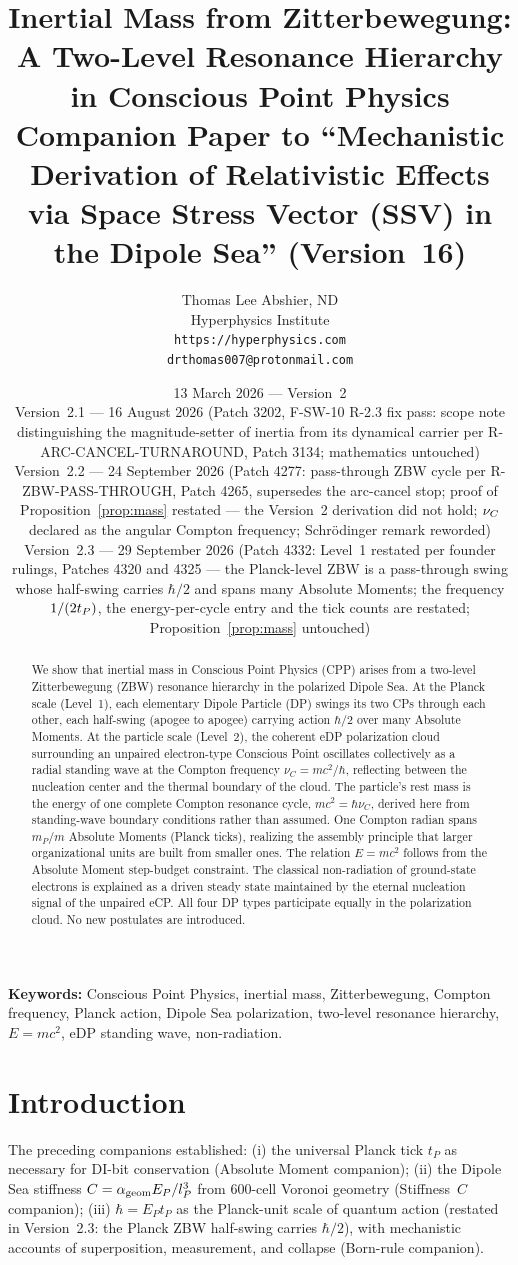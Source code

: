 \documentclass[12pt]{article}
\title{\textbf{Inertial Mass from Zitterbewegung:\\
A Two-Level Resonance Hierarchy in Conscious Point Physics}\\[6pt]
{\large Companion Paper to ``Mechanistic Derivation of Relativistic Effects\\
via Space Stress Vector (SSV) in the Dipole Sea'' (Version~16)}}
\author{Thomas Lee Abshier, ND\\
Hyperphysics Institute\\
\texttt{https://hyperphysics.com}\\
\texttt{drthomas007@protonmail.com}}
\date{13 March 2026 --- Version~2\\[2pt]
{\small Version~2.1 --- 16 August 2026 (Patch 3202, F-SW-10 R-2.3 fix pass:
scope note distinguishing the magnitude-setter of inertia from its dynamical
carrier per R-ARC-CANCEL-TURNAROUND, Patch 3134; mathematics untouched)\\[2pt]
Version~2.2 --- 24 September 2026 (Patch 4277: pass-through ZBW cycle per
R-ZBW-PASS-THROUGH, Patch 4265, supersedes the arc-cancel stop; proof of
Proposition~\ref{prop:mass} restated --- the Version~2 derivation did not hold;
$\nuC$ declared as the angular Compton frequency; Schr\"odinger remark
reworded)\\[2pt]
Version~2.3 --- 29 September 2026 (Patch 4332: Level~1 restated per founder rulings,
Patches 4320 and 4325 --- the Planck-level ZBW is a pass-through swing whose half-swing
carries $\hbar/2$ and spans many Absolute Moments; the frequency $1/(2\tP)$, the
energy-per-cycle entry and the tick counts are restated; Proposition~\ref{prop:mass}
untouched)}}
\newcommand{\lP}{l_P}
\newcommand{\EP}{E_P}
\newcommand{\tP}{t_P}
\newcommand{\mP}{m_P}
\newcommand{\nuC}{\nu_C}
\newcommand{\alphageom}{\alpha_{\rm geom}}
\begin{document}
\maketitle

\noindent\textbf{Keywords:} Conscious Point Physics, inertial mass,
Zitterbewegung, Compton frequency, Planck action, Dipole Sea polarization,
two-level resonance hierarchy, $E = mc^2$, eDP standing wave, non-radiation.

\begin{abstract}
We show that inertial mass in Conscious Point Physics (CPP) arises from a
two-level Zitterbewegung (ZBW) resonance hierarchy in the polarized Dipole
Sea.  At the Planck scale (Level~1), each elementary Dipole Particle (DP)
swings its two CPs through each other, each half-swing (apogee to apogee)
carrying action $\hbar/2$ over many Absolute Moments.  At the particle scale (Level~2), the coherent eDP
polarization cloud surrounding an unpaired electron-type Conscious Point
oscillates collectively as a radial standing wave at the Compton frequency
$\nuC = mc^2/\hbar$, reflecting between the nucleation center and the
thermal boundary of the cloud.  The particle's rest mass is the energy of
one complete Compton resonance cycle, $mc^2 = \hbar\nuC$, derived here from
standing-wave boundary conditions rather than assumed.  One Compton radian
spans $\mP/m$ Absolute Moments (Planck ticks), realizing the assembly principle that larger organizational
units are built from smaller ones.  The relation $E = mc^2$ follows from
the Absolute Moment step-budget constraint.  The classical non-radiation of
ground-state electrons is explained as a driven steady state maintained by
the eternal nucleation signal of the unpaired eCP.  All four DP types
participate equally in the polarization cloud.  No new postulates are
introduced.
\end{abstract}

\section{Introduction}
\label{sec:intro}

The preceding companions established:
(i) the universal Planck tick $\tP$ as necessary for DI-bit conservation
(Absolute Moment companion);
(ii) the Dipole Sea stiffness $C = \alphageom\EP/\lP^3$ from 600-cell
Voronoi geometry (Stiffness~$C$ companion);
(iii) $\hbar = \EP\tP$ as the Planck-unit scale of quantum action (restated in
Version~2.3: the Planck ZBW half-swing carries $\hbar/2$), with
mechanistic accounts of superposition, measurement, and collapse (Born-rule
companion).
\end{document}
